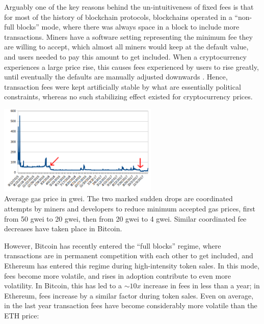 \documentclass[12pt, final]{article}
\begin{document}
Arguably one of the key reasons behind the un-intuitiveness of fixed fees is that for most of the history of blockchain protocols, blockchains operated in a ``non-full blocks'' mode, where there was always space in a block to include more transactions. Miners have a software setting representing the minimum fee they are willing to accept, which almost all miners would keep at the default value, and users needed to pay this amount to get included. When a cryptocurrency experiences a large price rise, this causes fees experienced by users to rise greatly, until eventually the defaults are manually adjusted downwards \cite{coindesk-btc-txn-fee, reddit-rec-miners, vitalik-twitter1}.  Hence, transaction fees were kept artificially stable by what are essentially political constraints, whereas no such stabilizing effect existed for cryptocurrency prices.

\begin{center}
\includegraphics[width=3in]{GaspriceInGwei.png} \\
\scriptsize{Average gas price in gwei. The two marked sudden drops are coordinated attempts by miners and developers to reduce minimum accepted gas prices, first from 50 gwei to 20 gwei, then from 20 gwei to 4 gwei. Similar coordinated fee decreases have taken place in Bitcoin\cite{btcfeesdown10x}.}
\end{center}

However, Bitcoin has recently entered the ``full blocks'' regime, where transactions are in permanent competition with each other to get included, and Ethereum has entered this regime during high-intensity token sales\cite{braveICO}. In this mode, fees become more volatile, and rises in adoption contribute to even more volatility. In Bitcoin, this has led to a $\sim 10x$ increase in fees in less than a year; in Ethereum, fees increase by a similar factor during token sales. Even on average, in the last year transaction fees have become considerably more volatile than the ETH price:
\end{document}

